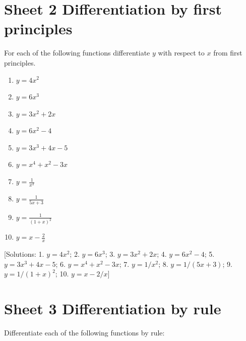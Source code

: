 \documentclass[
  11pt,
  oneside]{book}
\providecommand{\tightlist}{%
  \setlength{\itemsep}{0pt}\setlength{\parskip}{0pt}}
\newcommand{\slide}{}
\theoremstyle{definition}
\theoremstyle{definition}
\theoremstyle{definition}
\theoremstyle{definition}
\theoremstyle{remark}
\begin{document}
\section{Sheet 2 Differentiation by first principles}\label{sheet-2-differentiation-by-first-principles}

For each of the following functions differentiate \(y\) with respect to \(x\) from first principles.

\begin{enumerate}
\def\labelenumi{\arabic{enumi}.}
\tightlist
\item
  \(y=4x^2\)
\item
  \(y=6x^3\)
\item
  \(y=3x^2+2x\)
\item
  \(y=6x^2-4\)
\item
  \(y=3x^3+4x-5\)
\item
  \(y=x^4+x^2-3x\)
\item
  \(y=\frac{1}{x^2}\)
\item
  \(y=\frac{1}{5x+3}\)
\item
  \(y=\frac{1}{(1+x)^2}\)
\item
  \(y=x-\frac{2}{x}\)
\end{enumerate}

\slide

{[}Solutions: 1. \(y=4x^2\); 2. \(y=6x^3\); 3. \(y=3x^2+2x\); 4. \(y=6x^2-4\); 5. \(y=3x^3+4x-5\); 6. \(y=x^4+x^2-3x\); 7. \(y=1/x^2\); 8. \(y=1/(5x+3)\); 9. \(y=1/(1+x)^2\); 10. \(y=x-2/x\){]}

\slide

\section{Sheet 3 Differentiation by rule}\label{sheet-3-differentiation-by-rule}

Differentiate each of the following functions by rule:
\end{document}
